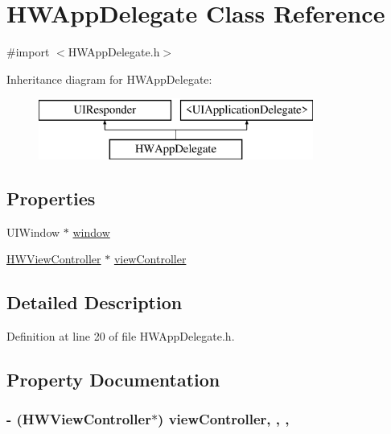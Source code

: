 \hypertarget{interface_h_w_app_delegate}{\section{H\-W\-App\-Delegate Class Reference}
\label{interface_h_w_app_delegate}
}


{\ttfamily \#import $<$H\-W\-App\-Delegate.\-h$>$}

Inheritance diagram for H\-W\-App\-Delegate\-:\begin{figure}[H]
\begin{center}
\leavevmode
\includegraphics[height=2.000000cm]{interface_h_w_app_delegate}
\end{center}
\end{figure}
\subsection*{Properties}
\begin{DoxyCompactItemize}
\item 
U\-I\-Window $\ast$ \hyperlink{interface_h_w_app_delegate_ac8271df4ea48850f9df0a265dfc6f213}{window}
\item 
\hyperlink{interface_h_w_view_controller}{H\-W\-View\-Controller} $\ast$ \hyperlink{interface_h_w_app_delegate_a154c1f1e02d6fed380a23c4947872b2d}{view\-Controller}
\end{DoxyCompactItemize}


\subsection{Detailed Description}


Definition at line 20 of file H\-W\-App\-Delegate.\-h.



\subsection{Property Documentation}
\hypertarget{interface_h_w_app_delegate_a154c1f1e02d6fed380a23c4947872b2d}{
\subsubsection[{view\-Controller}]{\setlength{\rightskip}{0pt plus 5cm}-\/ ({\bf H\-W\-View\-Controller}$\ast$) view\-Controller\hspace{0.3cm}{\ttfamily [read]}, {\ttfamily [write]}, {\ttfamily [nonatomic]}, {\ttfamily [strong]}}}\label{interface_h_w_app_delegate_a154c1f1e02d6fed380a23c4947872b2d}


